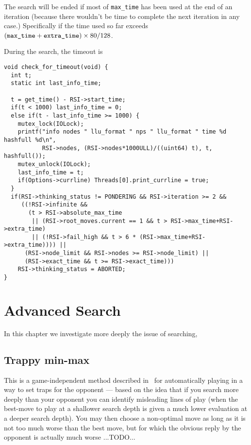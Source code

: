 \documentclass[10pt,dvipdfmx]{report}
\let\x=\times
\begin{document}
The search will be ended if most of \verb|max_time| has been used at the end
of an iteration (because there wouldn't be time to complete the next iteration
in any case.)  Specifically if the time used so far exceeds
$(\verb|max_time| + \verb|extra_time|)\x80/128$.

During the search, the timeout is
{\scriptsize
\begin{verbatim}
void check_for_timeout(void) {
  int t;
  static int last_info_time;

  t = get_time() - RSI->start_time;
  if(t < 1000) last_info_time = 0;
  else if(t - last_info_time >= 1000) {
    mutex_lock(IOLock);
    printf("info nodes " llu_format " nps " llu_format " time %d hashfull %d\n",
           RSI->nodes, (RSI->nodes*1000ULL)/((uint64) t), t, hashfull());
    mutex_unlock(IOLock);
    last_info_time = t;
    if(Options->currline) Threads[0].print_currline = true;
  }
  if(RSI->thinking_status != PONDERING && RSI->iteration >= 2 &&
     ((!RSI->infinite && 
       (t > RSI->absolute_max_time
        || (RSI->root_moves.current == 1 && t > RSI->max_time+RSI->extra_time) 
        || (!RSI->fail_high && t > 6 * (RSI->max_time+RSI->extra_time)))) ||
      (RSI->node_limit && RSI->nodes >= RSI->node_limit) ||
      (RSI->exact_time && t >= RSI->exact_time)))
    RSI->thinking_status = ABORTED;
}
\end{verbatim}
}


\chapter{Advanced Search}
\label{chap-advanced-search}

In this chapter we investigate more deeply the issue of searching,

\section{Trappy min-max}

This is a game-independent method described in~\cite{gordonreda}
for automatically playing in a way to set traps for the opponent
--- based on the idea that if you search more deeply than your opponent you can
identify misleading lines of play (when the best-move to play at a shallower
search depth is given a much lower evaluation at a deeper search depth).
You may then choose a non-optimal move as long as it is not too much worse than the
best move, but for which the obvious reply by the opponent is actually much worse ...TODO...
\end{document}

